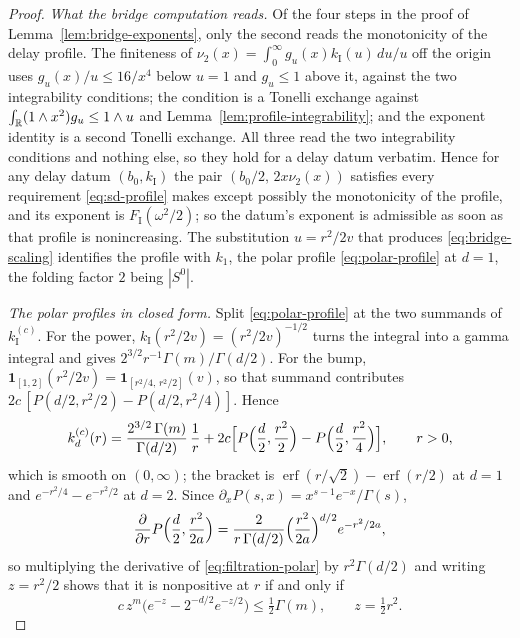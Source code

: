 \begin{proof}
\emph{What the bridge computation reads.} Of the four steps in the proof of
Lemma~\ref{lem:bridge-exponents}, only the second reads the monotonicity of the delay profile.
The finiteness of $\nu_2(x) = \int_0^\infty g_u(x)k_{\mathrm I}(u)\,du/u$ off the origin uses
$g_u(x)/u \le 16/x^4$ below $u = 1$ and $g_u \le 1$ above it, against the two integrability
conditions; the \Levy{} condition is a Tonelli exchange against
$\int_{\mathbb{R}} (1 \wedge x^2)g_u \le 1 \wedge u$ and Lemma~\ref{lem:profile-integrability}; and the
exponent identity is a second Tonelli exchange. All three read the two integrability conditions
and nothing else, so they hold for a delay datum verbatim. Hence for any delay datum
$(b_0, k_{\mathrm I})$ the pair $(b_0/2,\,2x\nu_2(x))$ satisfies every requirement
\ref{eq:sd-profile} makes except possibly the monotonicity of the profile, and its exponent is
$F_{\mathrm I}(\omega^2/2)$; so the datum's exponent is admissible as soon as that profile is
nonincreasing. The substitution $u = r^2/2v$ that produces \ref{eq:bridge-scaling} identifies
the profile with $k_1$, the polar profile \ref{eq:polar-profile} at $d = 1$, the folding factor
$2$ being $|S^0|$.

\emph{The polar profiles in closed form.} Split \ref{eq:polar-profile} at the two summands of
$k^{(c)}_{\mathrm I}$. For the power, $k_{\mathrm I}(r^2/2v) = (r^2/2v)^{-1/2}$ turns the integral
into a gamma integral and gives $2^{3/2}r^{-1}\Gamma(m)/\Gamma(d/2)$. For the bump,
$\mathbf{1}_{[1,2]}(r^2/2v) = \mathbf{1}_{[r^2/4,\,r^2/2]}(v)$, so that summand contributes
$2c\,[P(d/2, r^2/2) - P(d/2, r^2/4)]$. Hence
\begin{equation}\label{eq:filtration-polar}
  k^{(c)}_d(r) = \frac{2^{3/2}\,\Gamma(m)}{\Gamma(d/2)}\,\frac1r
   + 2c\Bigl[P\Bigl(\frac d2,\frac{r^2}2\Bigr) - P\Bigl(\frac d2,\frac{r^2}4\Bigr)\Bigr],
   \qquad r > 0 ,
\end{equation}
which is smooth on $(0,\infty)$; the bracket is
$\operatorname{erf}(r/\sqrt2) - \operatorname{erf}(r/2)$ at $d = 1$ and $e^{-r^2/4} - e^{-r^2/2}$
at $d = 2$. Since $\partial_x P(s,x) = x^{s-1}e^{-x}/\Gamma(s)$,
\[
  \frac{\partial}{\partial r}P\Bigl(\frac d2, \frac{r^2}{2a}\Bigr)
   = \frac{2}{r\,\Gamma(d/2)}\Bigl(\frac{r^2}{2a}\Bigr)^{d/2}e^{-r^2/2a} ,
\]
so multiplying the derivative of \ref{eq:filtration-polar} by $r^2\Gamma(d/2)$ and writing
$z = r^2/2$ shows that it is nonpositive at $r$ if and only if
\begin{equation}\label{eq:filtration-criterion}
  c\,z^m\bigl(e^{-z} - 2^{-d/2}e^{-z/2}\bigr) \le \tfrac12\Gamma(m), \qquad z = \tfrac12 r^2 .
\end{equation}


\end{proof}
